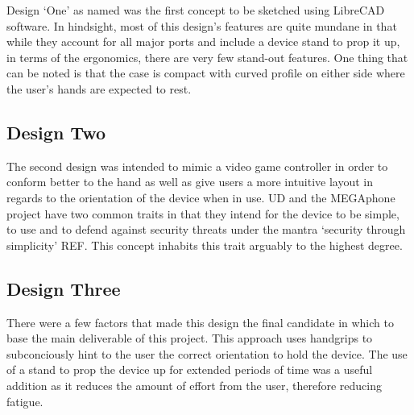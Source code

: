 Design ‘One’ as named was the first concept to be sketched using LibreCAD software. 
In hindsight, most of this design’s features are quite mundane in that while they account for all major ports and include a device stand to prop it up, in terms of the ergonomics, there are very few stand-out features. 
One thing that can be noted is that the case is compact with curved profile on either side where the user’s hands are expected to rest.


\subsection{Design Two}

The second design was intended to mimic a video game controller in order to conform better to the hand as well as give users a more intuitive layout in regards to the orientation of the device when in use. 
UD and the MEGAphone project have two common traits in that they intend for the device to be simple, to use and to defend against security threats under the mantra ‘security through simplicity’ REF. 
This concept inhabits this trait arguably to the highest degree.


\subsection{Design Three}

There were a few factors that made this design the final candidate in which to base the main deliverable of this project.
This approach uses handgrips to subconciously hint to the user the correct orientation to hold the device.
The use of a stand to prop the device up for extended periods of time was a useful addition as it reduces the amount of effort from the user, therefore reducing fatigue.

